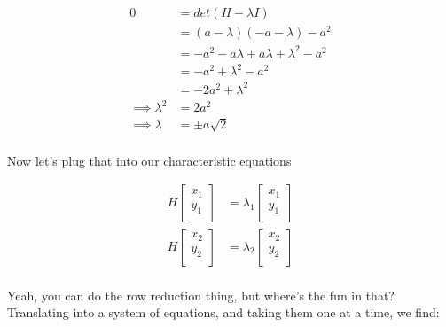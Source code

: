 \begin{answer}
  
  \begin{equation}
    \begin{split}
      0 &= det(H - \lambda I)\\
      &= (a - \lambda)(-a - \lambda) - a^2\\
      &= -a^2 - a\lambda + a\lambda + \lambda^2 - a^2\\
      &= -a^2 + \lambda^2 - a^2\\
      &= -2a^2 + \lambda^2\\
      \implies \lambda^2 &= 2a^2\\
      \implies \lambda &= \pm a \sqrt{2}\\
    \end{split}
  \end{equation}

  Now let's plug that into our characteristic equations

  \begin{equation}
    \begin{split}
      H
      \begin{bmatrix}
        x_1\\
        y_1\\
      \end{bmatrix}
      &= \lambda_1
      \begin{bmatrix}
        x_1\\
        y_1\\
      \end{bmatrix}\\
      H
      \begin{bmatrix}
        x_2\\
        y_2\\
      \end{bmatrix}
      &= \lambda_2
      \begin{bmatrix}
        x_2\\
        y_2\\
      \end{bmatrix}\\
    \end{split}
  \end{equation}

  Yeah, you can do the row reduction thing, but where's the fun in
  that?  Translating into a system of equations, and taking them one
  at a time, we find:


\end{answer}
